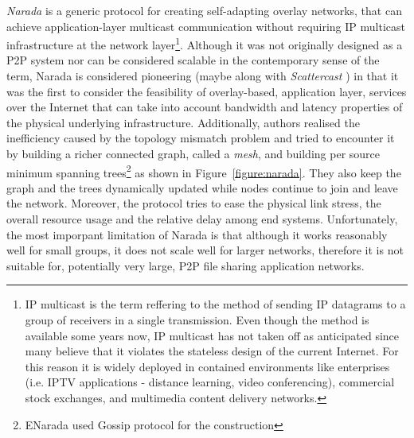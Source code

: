 \emph{Narada} \cite{chu_esm_2000,chu_esm_2001,chu_esm_2002} is a generic
protocol for creating self-adapting overlay networks, that can achieve
application-layer multicast communication without requiring IP multicast
infrastructure at the network layer\footnote{
  IP multicast is the term reffering to the method of sending IP datagrams to a
  group of receivers in a single transmission. Even though the method is
  available some years now, IP multicast has not taken off as anticipated since
  many believe that it violates the stateless design of the current Internet.
  For this reason it is widely deployed in contained environments like
  enterprises (i.e. IPTV applications - distance learning, video conferencing),
  commercial stock exchanges, and multimedia content delivery networks.
}. Although it was not originally designed as a P2P system nor can be considered
scalable in the contemporary sense of the term, Narada is considered pioneering
(maybe along with \emph{Scattercast} \cite{chawathe_scattercast_2000}) in that
it was the first to consider the feasibility of overlay-based, application
layer, services over the Internet that can take into account bandwidth and
latency properties of the physical underlying infrastructure. Additionally,
authors realised the inefficiency caused by the topology mismatch problem and
tried to encounter it by building a richer connected graph, called a
\emph{mesh}, and building per source minimum spanning trees\footnote{
  ENarada \cite{li_enarada_2008} used Gossip protocol for the construction
}
as shown in Figure~\ref{figure:narada}. They also keep the graph and the trees
dynamically updated while nodes continue to join and leave the network.
Moreover, the protocol tries to ease the physical link stress, the overall
resource usage and the relative delay among end systems. Unfortunately, the most
imporpant limitation of Narada is that although it works reasonably well for
small groups, it does not scale well for larger networks, therefore it is not
suitable for, potentially very large, P2P file sharing application networks.

